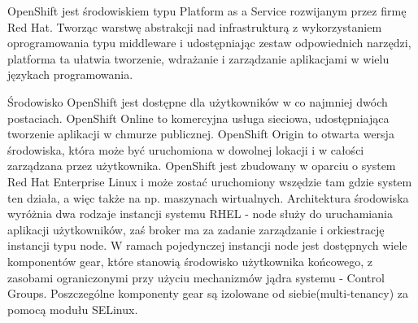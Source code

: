 
\label{sec:openShift}

OpenShift jest środowiskiem typu Platform as a Service rozwijanym przez firmę Red Hat. Tworząc warstwę abstrakcji nad infrastrukturą z wykorzystaniem oprogramowania typu middleware i udostępniając zestaw odpowiednich narzędzi, platforma ta ułatwia tworzenie, wdrażanie i zarządzanie aplikacjami w wielu językach programowania\cite{OpenShift14}. 

Środowisko OpenShift jest dostępne dla użytkowników w co najmniej dwóch postaciach. OpenShift Online to komercyjna usługa sieciowa, udostępniająca tworzenie aplikacji w chmurze publicznej. OpenShift Origin to otwarta wersja środowiska, która może być uruchomiona w dowolnej lokacji i w całości zarządzana przez użytkownika\cite{OpenShiftOrigin14}.
OpenShift jest zbudowany w oparciu o system Red Hat Enterprise Linux i może zostać uruchomiony wszędzie tam gdzie system ten działa, a więc także na np. maszynach wirtualnych. Architektura środowiska wyróżnia dwa rodzaje instancji systemu RHEL - node służy do uruchamiania aplikacji użytkowników, zaś broker ma za zadanie zarządzanie i orkiestrację instancji typu node. W ramach pojedynczej instancji node jest dostępnych wiele komponentów gear, które stanowią środowisko użytkownika końcowego, z zasobami ograniczonymi przy użyciu mechanizmów jądra systemu - Control Groups. Poszczególne komponenty gear są izolowane od siebie(multi-tenancy) za pomocą modułu SELinux. 

